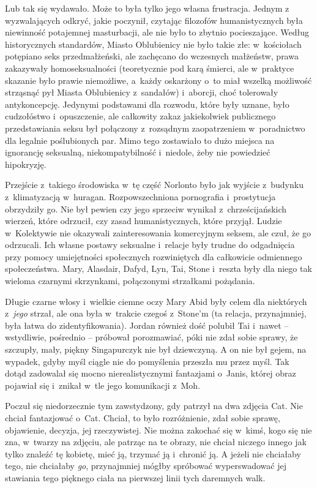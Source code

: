 \documentclass[oneside,polish,11pt,sfheadings]{mwbk}
\begin{document}
Lub tak się wydawało. Może to była tylko jego własna frustracja. Jednym
z wyzwalających odkryć, jakie poczynił, czytając filozofów
humanistycznych była niewinność potajemnej masturbacji, ale nie było to
zbytnio pocieszające. Według historycznych standardów, Miasto
Oblubienicy nie było takie złe: w~kościołach potępiano seks
przedmałżeński, ale zachęcano do wczesnych małżeństw, prawa zakazywały
homoseksualności (teoretycznie pod karą śmierci, ale w~praktyce skazanie
było prawie niemożliwe, a~każdy oskarżony o~to miał wszelką możliwość
strząsnąć pył Miasta Oblubienicy z~sandałów) i~aborcji, choć tolerowały
antykoncepcję. Jedynymi podstawami dla rozwodu, które były uznane, było
cudzołóstwo i~opuszczenie, ale całkowity zakaz jakiekolwiek publicznego
przedstawiania seksu był połączony z~rozsądnym zaopatrzeniem w~poradnictwo dla legalnie poślubionych par. Mimo tego zostawiało to dużo
miejsca na ignorancję seksualną, niekompatybilność i~niedole, żeby nie
powiedzieć hipokryzję.

Przejście z~takiego środowiska w~tę część Norlonto było jak wyjście z~budynku z~klimatyzacją w~huragan. Rozpowszechniona pornografia i~prostytucja obrzydziły go. Nie był pewien czy jego sprzeciw wynikał z~chrześcijańskich wierzeń, które odrzucił, czy zasad humanistycznych,
które przyjął. Ludzie w~Kolektywie nie okazywali zainteresowania
komercyjnym seksem, ale czuł, że go odrzucali. Ich własne postawy
seksualne i~relacje były trudne do odgadnięcia przy pomocy umiejętności
społecznych rozwiniętych dla całkowicie odmiennego społeczeństwa. Mary,
Alasdair, Dafyd, Lyn, Tai, Stone i~reszta były dla niego tak wieloma
czarnymi skrzynkami, połączonymi strzałkami pożądania.

Długie czarne włosy i~wielkie ciemne oczy Mary Abid były celem dla
niektórych z~\emph{jego }strzał, ale ona była w~trakcie czegoś z~Stone'm
(ta relacja, przynajmniej, była łatwa do zidentyfikowania). Jordan
również dość polubił Tai i~nawet -- wstydliwie, pośrednio -- próbował
porozmawiać, póki nie zdał sobie sprawy, że szczupły, mały, piękny
Singapurczyk nie był dziewczyną. A on nie był gejem, na wypadek, gdyby
myśl ciągle nie do pomyślenia przeszła mu przez myśl. Tak dotąd
zadowalał się mocno nierealistycznymi fantazjami o~Janis, której obraz
pojawiał się i~znikał w~tle jego komunikacji z~Moh.

Poczuł się niedorzecznie tym zawstydzony, gdy patrzył na dwa zdjęcia
Cat. Nie chciał fantazjować o~Cat. Chciał, to było rozróżnienie, zdał
sobie sprawę, objawienie, decyzja, jej rzeczywistej. Nie można zakochać
się w~kimś, kogo się nie zna, w~twarzy na zdjęciu, ale patrząc na te
obrazy, nie chciał niczego innego jak tylko znaleźć tę kobietę, mieć ją,
trzymać ją i~chronić ją. A jeżeli nie chciałaby tego, nie chciałaby
\emph{go}, przynajmniej mógłby spróbować wyperswadować jej stawiania
tego pięknego ciała na pierwszej linii tych daremnych walk.
\end{document}
